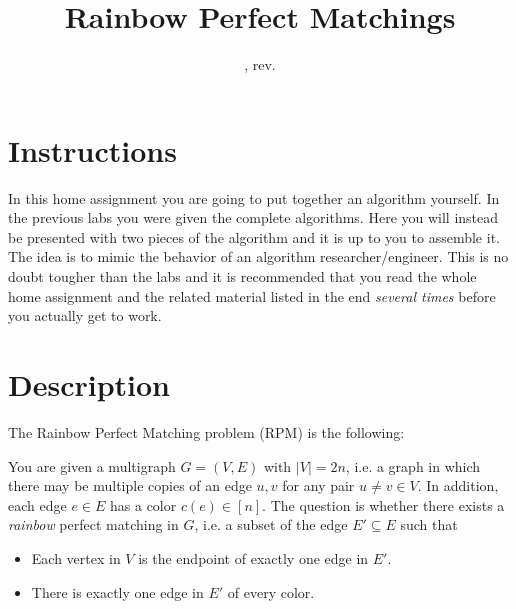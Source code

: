 \documentclass{tufte-handout}
\title{Rainbow Perfect Matchings}
\author{}
\date{\GITAuthorDate, rev. \GITAbrHash}
\begin{document}
\maketitle
\section*{Instructions}
In this home assignment you are going to put together an algorithm yourself. In the previous labs you were given the complete algorithms. Here you will instead be presented with two pieces of the algorithm and it is up to you to assemble it. The idea is to mimic the behavior of an algorithm researcher/engineer. This is no doubt tougher than the labs and it is recommended that you read the whole home assignment and the related material listed in the end \emph{several times} before you actually get to work.

\section*{Description}
\noindent The Rainbow Perfect Matching problem (RPM) is the following: 

You are given a multigraph $G=(V,E)$ with $|V|=2n$, i.e. a graph in which there may be multiple copies of an edge $u,v$ for any pair $u\neq v\in V$. In addition, each edge $e\in E$ has a color $c(e)\in [n]$. The question is whether there exists a \emph{rainbow} perfect matching in $G$, i.e. a subset of the edge $E'\subseteq E$ such that
\begin{itemize}
\item Each vertex in $V$ is the endpoint of exactly one edge in $E'$.
\item There is exactly one edge in $E'$ of every color.
\end{itemize}
\end{document}
